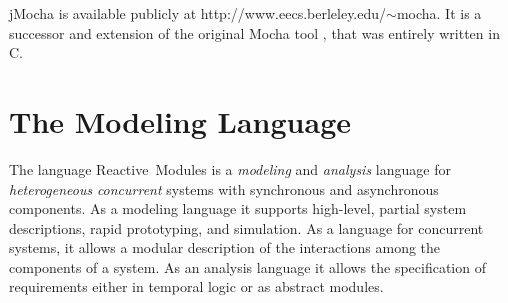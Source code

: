 \documentclass[10pt,twocolumn]{article}
\def\jmocha{{\small\sc jMocha}}
\newcommand{\rem}{\mbox{\small\sc Reactive Modules}}
\begin{document}
%
jMocha is available publicly at http://www.eecs.berleley.edu/$\sim$mocha.
It is a successor and extension of the original Mocha tool \cite{Mocha98}, 
that was entirely written in C. 

\section{The Modeling Language}
\label{sec:The Modeling Language}
The language \rem{} \cite{Modules} is a \emph{modeling} and {\em
  analysis} language for \emph{heterogeneous} \emph{concurrent} systems with
synchronous and asynchronous components. As a modeling language it supports
high-level, partial system descriptions, rapid prototyping, and simulation. 
As a language for concurrent systems, it allows a modular
description of the interactions among the components of a system.
As an analysis language it allows the specification of requirements 
either in temporal logic \cite{ATL} or as abstract modules.
\end{document}

